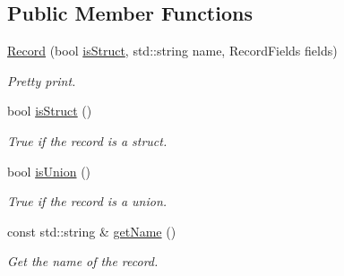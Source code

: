 \subsection*{Public Member Functions}
\begin{DoxyCompactItemize}
\item 
\mbox{\label{classspan_1_1ir_1_1types_1_1Record_aaffc549bf481290c5cbb860b937375c0}} 
\hyperlink{classspan_1_1ir_1_1types_1_1Record_aaffc549bf481290c5cbb860b937375c0}{Record} (bool \hyperlink{classspan_1_1ir_1_1types_1_1Record_a631af1ee00c453b7dc58ccaeb4684f7b}{is\+Struct}, std\+::string name, Record\+Fields fields)
\begin{DoxyCompactList}\small\item\em Pretty print. \end{DoxyCompactList}\item 
\mbox{\label{classspan_1_1ir_1_1types_1_1Record_a631af1ee00c453b7dc58ccaeb4684f7b}} 
bool \hyperlink{classspan_1_1ir_1_1types_1_1Record_a631af1ee00c453b7dc58ccaeb4684f7b}{is\+Struct} ()
\begin{DoxyCompactList}\small\item\em True if the record is a struct. \end{DoxyCompactList}\item 
\mbox{\label{classspan_1_1ir_1_1types_1_1Record_aa7e33bd5113497cc37707dd227748897}} 
bool \hyperlink{classspan_1_1ir_1_1types_1_1Record_aa7e33bd5113497cc37707dd227748897}{is\+Union} ()
\begin{DoxyCompactList}\small\item\em True if the record is a union. \end{DoxyCompactList}\item 
\mbox{\label{classspan_1_1ir_1_1types_1_1Record_a9d78af2b0e1bb484b7c3640b26f47e88}} 
const std\+::string \& \hyperlink{classspan_1_1ir_1_1types_1_1Record_a9d78af2b0e1bb484b7c3640b26f47e88}{get\+Name} ()
\begin{DoxyCompactList}\small\item\em Get the name of the record. \end{DoxyCompactList}\item 
\mbox{\label{classspan_1_1ir_1_1types_1_1Record_ad3b07b1a3bd3e8d9d46ec2cbcb3930b4}} 

\end{DoxyCompactItemize}
